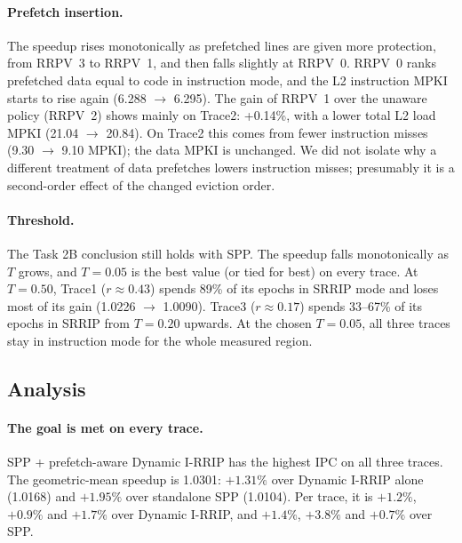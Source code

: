 \documentclass[11pt]{article}
\begin{document}
\paragraph{Prefetch insertion.} The speedup rises monotonically as prefetched lines are given more
protection, from RRPV~3 to RRPV~1, and then falls slightly at RRPV~0. RRPV~0 ranks prefetched
data equal to code in instruction mode, and the L2 instruction MPKI starts to rise again (6.288
$\to$ 6.295). The gain of RRPV~1 over the unaware policy (RRPV~2) shows mainly on Trace2:
+0.14\%, with a lower total L2 load MPKI (21.04 $\to$ 20.84). On Trace2 this comes from fewer
instruction misses (9.30 $\to$ 9.10 MPKI); the data MPKI is unchanged. We did not isolate why a
different treatment of data prefetches lowers instruction misses; presumably it is a second-order
effect of the changed eviction order.

\paragraph{Threshold.} The Task 2B conclusion still holds with SPP. The speedup falls
monotonically as $T$ grows, and $T=0.05$ is the best value (or tied for best) on every trace. At $T=0.50$, Trace1
($r \approx 0.43$) spends 89\% of its epochs in SRRIP mode and loses most of its gain (1.0226
$\to$ 1.0090). Trace3 ($r \approx 0.17$) spends 33--67\% of its epochs in SRRIP from $T=0.20$
upwards. At the chosen $T=0.05$, all three traces stay in instruction mode for the whole measured
region.

\subsection{Analysis}

\paragraph{The goal is met on every trace.} SPP + prefetch-aware Dynamic I-RRIP has the highest IPC
on all three traces. The geometric-mean speedup is 1.0301: $+1.31\%$ over Dynamic I-RRIP alone
(1.0168) and $+1.95\%$ over standalone SPP (1.0104). Per trace, it is $+1.2\%$, $+0.9\%$ and
$+1.7\%$ over Dynamic I-RRIP, and $+1.4\%$, $+3.8\%$ and $+0.7\%$ over SPP.
\end{document}
